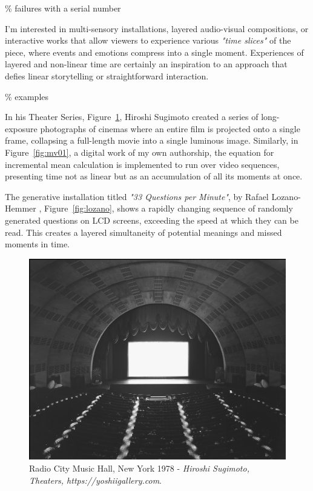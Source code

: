 {\scriptsize \textcolor{comment}{\% failures with a serial number}}

I'm interested in multi-sensory installations, layered audio-visual compositions, or interactive works that allow viewers to experience various \textit{"time slices"} of the piece, where events and emotions compress into a single moment. Experiences of layered and non-linear time are certainly an inspiration to an approach that defies linear storytelling or straightforward interaction.

{\scriptsize \textcolor{comment}{\% examples}}

In his Theater Series, Figure~\ref{fig:sugimoto}, Hiroshi Sugimoto \citep{sugimotohiroshi} created a series of long-exposure photographs of cinemas where an entire film is projected onto a single frame, collapsing a full-length movie into a single luminous image. Similarly, in Figure~\ref{fig:mv01}, a digital work of my own authorship, the equation for incremental mean calculation is implemented to run over video sequences, presenting time not as linear but as an accumulation of all its moments at once.

The generative installation titled \textit{"33 Questions per Minute"}, by Rafael Lozano-Hemmer \citep{lozano-hemmer}, Figure~\ref{fig:lozano}, shows a rapidly changing sequence of randomly generated questions on LCD screens, exceeding the speed at which they can be read. This creates a layered simultaneity of potential meanings and missed moments in time.

\begin{figure}
    \centering
    \includegraphics[width=0.8\linewidth]{assets/hiroshi-sugimoto-theaters-1978-1993-Radio-City-Music-Hall-1.png} 
    \caption{\small  Radio City Music Hall, New York 1978 - \textit{Hiroshi Sugimoto, Theaters, https://yoshiigallery.com}.}
    \label{fig:sugimoto}
\end{figure}


